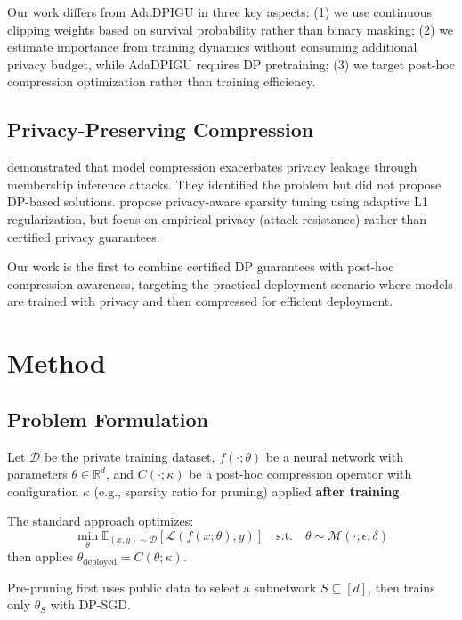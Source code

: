 \documentclass[11pt,a4paper]{article}
\begin{document}
Our work differs from AdaDPIGU in three key aspects: (1) we use continuous clipping weights based on survival probability rather than binary masking; (2) we estimate importance from training dynamics without consuming additional privacy budget, while AdaDPIGU requires DP pretraining; (3) we target post-hoc compression optimization rather than training efficiency.

\subsection{Privacy-Preserving Compression}

\citet{li2025compleak} demonstrated that model compression exacerbates privacy leakage through membership inference attacks. They identified the problem but did not propose DP-based solutions. \citet{hu2024past} propose privacy-aware sparsity tuning using adaptive L1 regularization, but focus on empirical privacy (attack resistance) rather than certified privacy guarantees.

Our work is the first to combine certified DP guarantees with post-hoc compression awareness, targeting the practical deployment scenario where models are trained with privacy and then compressed for efficient deployment.

\section{Method}

\subsection{Problem Formulation}

Let $\mathcal{D}$ be the private training dataset, $f(\cdot; \theta)$ be a neural network with parameters $\theta \in \mathbb{R}^d$, and $C(\cdot; \kappa)$ be a post-hoc compression operator with configuration $\kappa$ (e.g., sparsity ratio for pruning) applied \textbf{after training}.

The standard approach optimizes:
\begin{equation}
\min_{\theta} \mathbb{E}_{(x,y) \sim \mathcal{D}}[\mathcal{L}(f(x; \theta), y)] \quad \text{s.t.} \quad \theta \sim \mathcal{M}(\cdot; \epsilon, \delta)
\end{equation}
then applies $\theta_{\text{deployed}} = C(\theta; \kappa)$.

Pre-pruning \citep{adamczewski2023prepruning} first uses public data to select a subnetwork $S \subseteq [d]$, then trains only $\theta_S$ with DP-SGD.
\end{document}
